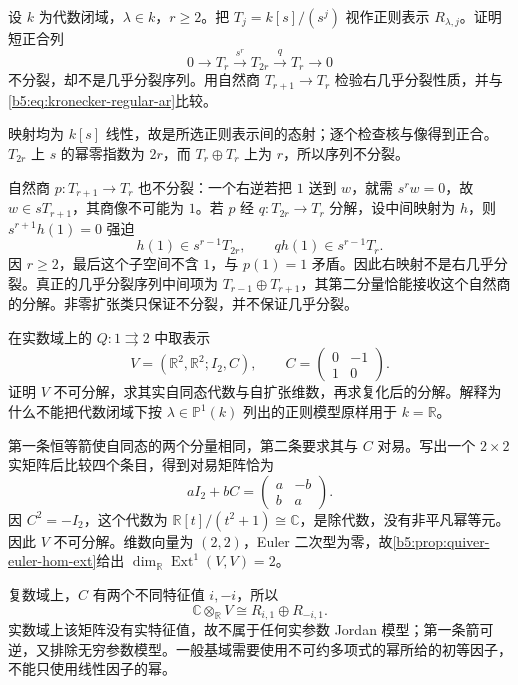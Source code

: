 \begin{optionalexercise}\label{b5:ex:10-nonsplit-not-almost-split}
	设 \(k\) 为代数闭域，\(\lambda\in k\)，\(r\ge2\)。把 \(T_j=k[s]/(s^j)\) 视作正则表示 \(R_{\lambda,j}\)。证明短正合列
	\[
		0\longrightarrow T_r\xrightarrow{\ s^r\ }T_{2r}
		\xrightarrow{q}T_r\longrightarrow0
	\]
	不分裂，却不是几乎分裂序列。用自然商 \(T_{r+1}\to T_r\) 检验右几乎分裂性质，并与\eqref{b5:eq:kronecker-regular-ar}比较。
\end{optionalexercise}
\begin{solution}
	映射均为 \(k[s]\) 线性，故是所选正则表示间的态射；逐个检查核与像得到正合。\(T_{2r}\) 上 \(s\) 的幂零指数为 \(2r\)，而 \(T_r\oplus T_r\) 上为 \(r\)，所以序列不分裂。

	自然商 \(p:T_{r+1}\to T_r\) 也不分裂：一个右逆若把 \(1\) 送到 \(w\)，就需 \(s^rw=0\)，故 \(w\in sT_{r+1}\)，其商像不可能为 \(1\)。若 \(p\) 经 \(q:T_{2r}\to T_r\) 分解，设中间映射为 \(h\)，则 \(s^{r+1}h(1)=0\) 强迫
	\[
		h(1)\in s^{r-1}T_{2r},\qquad
		qh(1)\in s^{r-1}T_r.
	\]
	因 \(r\ge2\)，最后这个子空间不含 \(1\)，与 \(p(1)=1\) 矛盾。因此右映射不是右几乎分裂。真正的几乎分裂序列中间项为 \(T_{r-1}\oplus T_{r+1}\)，其第二分量恰能接收这个自然商的分解。非零扩张类只保证不分裂，并不保证几乎分裂。
\end{solution}

\begin{optionalexercise}\label{b5:ex:10-real-kronecker-regular}
	在实数域上的 \(Q:1\rightrightarrows2\) 中取表示
	\[
		V=(\mathbb R^2,\mathbb R^2;I_2,C),\qquad
		C=\begin{pmatrix}0&-1\\1&0\end{pmatrix}.
	\]
	证明 \(V\) 不可分解，求其实自同态代数与自扩张维数，再求复化后的分解。解释为什么不能把代数闭域下按 \(\lambda\in\mathbb P^1(k)\) 列出的正则模型原样用于 \(k=\mathbb R\)。
\end{optionalexercise}
\begin{solution}
	第一条恒等箭使自同态的两个分量相同，第二条要求其与 \(C\) 对易。写出一个 \(2\times2\) 实矩阵后比较四个条目，得到对易矩阵恰为
	\[
		aI_2+bC=\begin{pmatrix}a&-b\\b&a\end{pmatrix}.
	\]
	因 \(C^2=-I_2\)，这个代数为 \(\mathbb R[t]/(t^2+1)\cong\mathbb C\)，是除代数，没有非平凡幂等元。因此 \(V\) 不可分解。维数向量为 \((2,2)\)，Euler 二次型为零，故\cref{b5:prop:quiver-euler-hom-ext}给出 \(\dim_{\mathbb R}\operatorname{Ext}^1(V,V)=2\)。

	复数域上，\(C\) 有两个不同特征值 \(i,-i\)，所以
	\[
		\mathbb C\otimes_{\mathbb R}V\cong R_{i,1}\oplus R_{-i,1}.
	\]
	实数域上该矩阵没有实特征值，故不属于任何实参数 Jordan 模型；第一条箭可逆，又排除无穷参数模型。一般基域需要使用不可约多项式的幂所给的初等因子，不能只使用线性因子的幂。
\end{solution}

